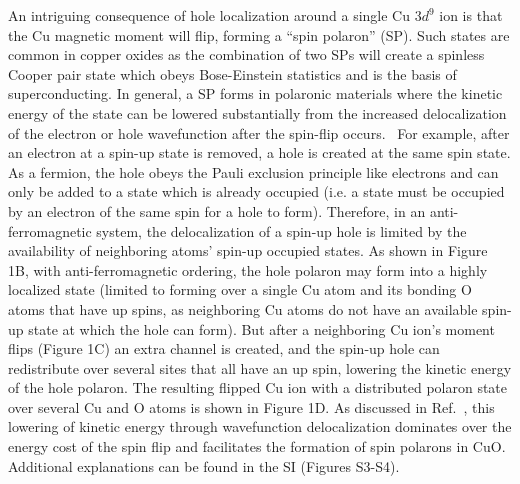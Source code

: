 An intriguing consequence of hole localization around a single Cu $3d^9$ ion is that the Cu magnetic moment will flip, forming a ``spin polaron'' (SP).\cite{de1962interactions,vigren1973mobility,mott1993polaron,chernyshev2003models,lu1990spin,yonemitsu1992sensitivity}
Such states are common in copper oxides as the combination of two SPs will create a spinless Cooper pair state which obeys Bose-Einstein statistics and is the basis of superconducting.\cite{mott1993polaron,alexandrov1994bipolarons} In general, a SP forms in polaronic materials where the kinetic energy of the state can be lowered substantially from the increased delocalization of the electron or hole wavefunction after the spin-flip occurs.~\cite{wood1992d} For example, after an electron at a spin-up state is removed, a hole is created at the same spin state. As a fermion, the hole obeys the Pauli exclusion principle like electrons and can only be added to a state which is already occupied (i.e. a state must be occupied by an electron of the same spin for a hole to form). Therefore, in an anti-ferromagnetic system, the delocalization of a spin-up hole is limited by the availability of neighboring atoms’ spin-up occupied states. As shown in Figure 1B, with anti-ferromagnetic ordering, the hole polaron may form into a highly localized state (limited to forming over a single Cu atom and its bonding O atoms that have up spins, as neighboring Cu atoms do not have an available spin-up state at which the hole can form). But after a neighboring Cu ion's moment flips (Figure 1C) an extra channel is created, and the spin-up hole can redistribute over several sites that all have an up spin, lowering the kinetic energy of the hole polaron. The resulting flipped Cu ion with a distributed polaron state over several Cu and O atoms is shown in Figure 1D. As discussed in Ref.~\cite{wood1992d}, this lowering of kinetic energy through wavefunction delocalization dominates over the energy cost of the spin flip and facilitates the formation of  spin polarons in CuO. Additional explanations can be found in the SI (Figures S3-S4).

